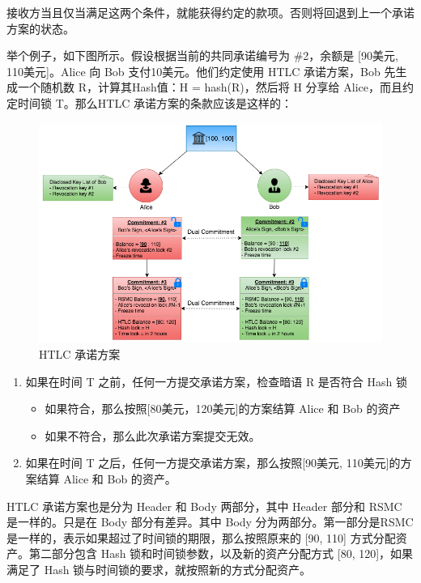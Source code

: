 接收方当且仅当满足这两个条件，就能获得约定的款项。否则将回退到上一个承诺方案的状态。

举个例子，如下图所示。假设根据当前的共同承诺编号为 \#2，余额是 [90美元, 110美元]。Alice 向 Bob 支付10美元。他们约定使用 HTLC 承诺方案，Bob 先生成一个随机数 R，计算其Hash值：H = hash(R)，然后将 H 分享给 Alice，而且约定时间锁 T。那么HTLC 承诺方案的条款应该是这样的：

\begin{figure}[h!]
    \centering
    \includegraphics[width=16cm, keepaspectratio]{../images/htlc-1.png}
    \caption{HTLC 承诺方案}
    \label{fig:htlc}
\end{figure}
\begin{enumerate}
    \item 如果在时间 T 之前，任何一方提交承诺方案，检查暗语 R 是否符合 Hash 锁
        \begin{itemize}
            \item 如果符合，那么按照[80美元，120美元]的方案结算 Alice 和 Bob 的资产
            \item 如果不符合，那么此次承诺方案提交无效。
        \end{itemize}
    \item 如果在时间 T 之后，任何一方提交承诺方案，那么按照[90美元, 110美元]的方案结算 Alice 和 Bob 的资产。
\end{enumerate}


HTLC 承诺方案也是分为 Header 和 Body 两部分，其中 Header 部分和 RSMC 是一样的。只是在 Body 部分有差异。其中 Body 分为两部分。第一部分是RSMC 是一样的，表示如果超过了时间锁的期限，那么按照原来的 [90, 110] 方式分配资产。第二部分包含 Hash 锁和时间锁参数，以及新的资产分配方式 [80, 120]，如果满足了 Hash 锁与时间锁的要求，就按照新的方式分配资产。

